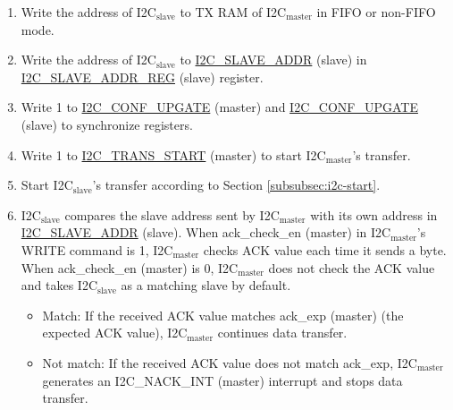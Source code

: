 \documentclass[main\_\_EN.tex]{subfiles}
\begin{document}
\begin{enumerate}
\item Write the address of I2C$_\text{slave}$ to TX RAM of I2C$_\text{master}$ in FIFO or non-FIFO mode.
\item Write the address of I2C$_\text{slave}$ to \hyperref[fielddesc:I2CSLAVEADDR]{I2C\_SLAVE\_ADDR} (slave) in \hyperref[regdesc:I2CSLAVEADDRREG]{I2C\_SLAVE\_ADDR\_REG} (slave) register.
\item Write 1 to \hyperref[fielddesc:I2CCONFUPGATE]{I2C\_CONF\_UPGATE} (master) and \hyperref[fielddesc:I2CCONFUPGATE]{I2C\_CONF\_UPGATE} (slave) to synchronize registers.
\item Write 1 to \hyperref[fielddesc:I2CTRANSSTART]{I2C\_TRANS\_START} (master) to start I2C$_\text{master}$'s transfer.
\item Start I2C$_\text{slave}$'s transfer according to Section \ref{subsubsec:i2c-start}.
\item I2C$_\text{slave}$ compares the slave address sent by I2C$_\text{master}$ with its own address in \hyperref[fielddesc:I2CSLAVEADDR]{I2C\_SLAVE\_ADDR} (slave). When ack\_check\_en (master) in I2C$_\text{master}$'s WRITE command is 1, I2C$_\text{master}$ checks ACK value each time it sends a byte. When ack\_check\_en (master) is 0, I2C$_\text{master}$ does not check the ACK value and takes I2C$_\text{slave}$ as a matching slave by default.

\begin{itemize}
\item Match: If the received ACK value matches ack\_exp (master) (the expected ACK value), I2C$_\text{master}$ continues data transfer.
\item Not match: If the received ACK value does not match ack\_exp, I2C$_\text{master}$ generates an I2C\_NACK\_INT (master) interrupt and stops data transfer.
\end{itemize}


\end{enumerate}
\end{document}

